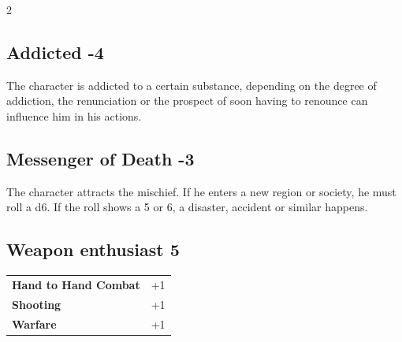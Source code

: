 \begin{multicols}{2}
\begin{tcolorbox}
\vspace{3mm}



\end{tcolorbox}

\begin{tcolorbox}
    \subsection*{Addicted \hfill \small{-4 }}
    \tcblower
The character is addicted to a certain substance, depending on the degree of addiction, the renunciation or the prospect of soon having to renounce can influence him in his actions.


\vspace{3mm}



\end{tcolorbox}

\begin{tcolorbox}
    \subsection*{Messenger of Death \hfill \small{-3 }}
    \tcblower
The character attracts the mischief. If he enters a new region or society, he must roll a d6. If the roll shows a 5 or 6, a disaster, accident or similar happens.


\vspace{3mm}



\end{tcolorbox}

\begin{tcolorbox}
    \subsection*{Weapon enthusiast \hfill \small{5 }}
    \tcblower




\begin{tabular}{@{}ll@{}}
    \textbf{Hand to Hand Combat} & +1\\
    \textbf{Shooting} & +1\\
    \textbf{Warfare} & +1\\
\end{tabular}


\end{tcolorbox}
\end{multicols}
